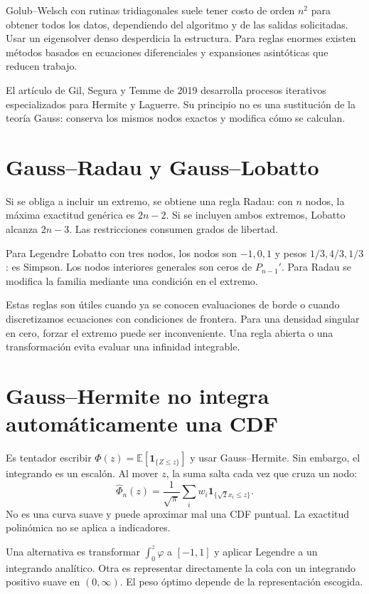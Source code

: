 \documentclass[11pt,a4paper]{article}
\newcommand{\E}{\mathbb E}
\newcommand{\ind}{\mathbf 1}
\theoremstyle{definition}
\newcommand{\ph}{\varphi}
\begin{document}
Golub--Welsch con rutinas tridiagonales suele tener costo de orden $n^2$ para obtener todos los datos, dependiendo del algoritmo y de las salidas solicitadas. Usar un eigensolver denso desperdicia la estructura. Para reglas enormes existen métodos basados en ecuaciones diferenciales y expansiones asintóticas que reducen trabajo.

El artículo de Gil, Segura y Temme de 2019 desarrolla procesos iterativos especializados para Hermite y Laguerre. Su principio no es una sustitución de la teoría Gauss: conserva los mismos nodos exactos y modifica cómo se calculan.

\section{Gauss--Radau y Gauss--Lobatto}
Si se obliga a incluir un extremo, se obtiene una regla Radau: con $n$ nodos, la máxima exactitud genérica es $2n-2$. Si se incluyen ambos extremos, Lobatto alcanza $2n-3$. Las restricciones consumen grados de libertad.

Para Legendre Lobatto con tres nodos, los nodos son $-1,0,1$ y pesos $1/3,4/3,1/3$: es Simpson. Los nodos interiores generales son ceros de $P_{n-1}'$. Para Radau se modifica la familia mediante una condición en el extremo.

Estas reglas son útiles cuando ya se conocen evaluaciones de borde o cuando discretizamos ecuaciones con condiciones de frontera. Para una densidad singular en cero, forzar el extremo puede ser inconveniente. Una regla abierta o una transformación evita evaluar una infinidad integrable.

\section{Gauss--Hermite no integra automáticamente una CDF}
Es tentador escribir
$\Phi(z)=\E[\ind_{\{Z\le z\}}]$ y usar Gauss--Hermite. Sin embargo, el integrando es un escalón. Al mover $z$, la suma salta cada vez que cruza un nodo:
\[
\widehat\Phi_n(z)=\frac1{\sqrt\pi}\sum_iw_i
\ind_{\{\sqrt2x_i\le z\}}.
\]
No es una curva suave y puede aproximar mal una CDF puntual. La exactitud polinómica no se aplica a indicadores.

Una alternativa es transformar $\int_0^z\ph$ a $[-1,1]$ y aplicar Legendre a un integrando analítico. Otra es representar directamente la cola con un integrando positivo suave en $(0,\infty)$. El peso óptimo depende de la representación escogida.
\end{document}
